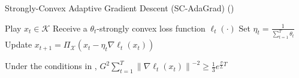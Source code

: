 \documentclass[final,12pt]{colt2018} %
\def\K{\mathcal{K}}
\newcommand{\norm}[1]{\left\lVert#1\right\rVert}
\newcommand{\norme}[1]{\norm{#1}}
\newcommand{\XX}{\mathcal{X}}
\begin{document}
\begin{algorithm}[h] 
  \caption{Strongly-Convex Adaptive Gradient Descent (SC-AdaGrad) (\cite{L17})}
  \label{alg:SC-AdaNGD}
  \begin{algorithmic}[1]
    \STATE Play $x_t \in \K$
    \STATE Receive a $\theta_t$-strongly convex loss function $\ell_{t}(\cdot)$
    \STATE Set $\eta_t = \frac{1}{\sum_{t=1}^T \theta_t}$
    \STATE Update $x_{t+1} = \Pi_{\XX} (x_t - \eta_t \nabla \ell_t(x_t))$  
    \ENDFOR
  \end{algorithmic}
\end{algorithm}

\begin{lemma} 
Under the conditions in ,
$G^2 \sum_{t=1}^T \norme{\nabla \ell_t(x_t)}^{-2} \ge \frac{1}{3}e^{\frac{\sigma}{L}T}$
\end{lemma}
\end{document}
